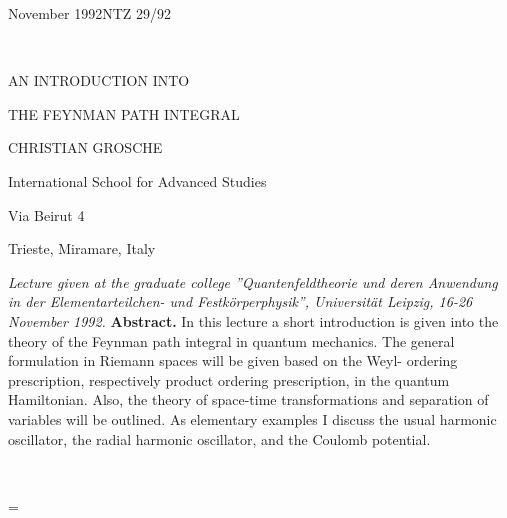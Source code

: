 {\nopagenumbers
{}
\centerline{November 1992\hfill NTZ 29/92}
\centerline{\ }
\bigskip
\centerline{\fourteenbf AN INTRODUCTION INTO}
\medskip
\centerline{\fourteenbf THE FEYNMAN PATH INTEGRAL}
\bigskip
\centerline{\large CHRISTIAN GROSCHE}
\bigskip
\centerline{\twelveit International School for Advanced Studies}
\centerline{\twelveit Via Beirut 4}
\centerline{ Trieste, Miramare, Italy}
\vfill
\midinsert
\narrower
\noindent
{\it Lecture given at the graduate college ''Quantenfeldtheorie und
deren Anwendung in der Elementarteilchen- und Festk\"orperphysik'',
Universit\"at Leipzig, 16-26 November 1992.}
\endinsert
\vfill
\midinsert
\narrower
\noindent
{\bf Abstract.}
In this lecture a short introduction is given into the theory of the
Feynman path integral in quantum mechanics. The general formulation in
Riemann spaces will be given based on the Weyl- ordering prescription,
respectively product ordering prescription, in the quantum Hamiltonian.
Also, the theory of space-time transformations and separation of
variables will be outlined. As elementary examples I discuss the usual
harmonic oscillator, the radial harmonic oscillator, and the Coulomb
potential.
\endinsert
\eject
{}
\centerline{\ }\newpage}


\newcount{}
\def\add{\advance\refno by 1}

\newcount\glno
\def\plus{\advance\glno by 1}
\def\num{\the\glno}

\newcount\chapno
\def\NUM{\the\chapno}

\def\makeheadline{\vbox to 0pt{\vskip-30.5pt
                  \line{\vbox to 8.5pt{}\the\headline}
                  \nointerlineskip\vskip1.5pt
                  \line{\hrulefill}\vss\nointerlineskip}}
\headline={\ifodd\pageno\rightheadline \else\leftheadline\fi}
\def\makefootline{\baselineskip=24pt
                  \line{\the\footline}}
\def\leftheadline{\eightpoint\eightrm\hfil\Chapter\hfil}
\def\rightheadline{\eightpoint\eightrm\Kapitel\hfil\Section}

